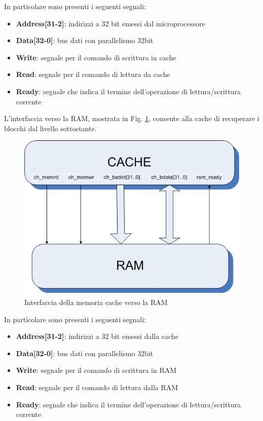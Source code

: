 In particolare sono presenti i seguenti segnali:
\begin{itemize} %
\item \textbf{Address[31-2]}: indirizzi a 32 bit emessi dal microprocessore
\item \textbf{Data[32-0]}: bus dati con parallelismo 32bit 
\item \textbf{Write}: segnale per il comando di scrittura in cache
\item \textbf{Read}: segnale per il comando di lettura da cache
\item \textbf{Ready}: segnale che indica il termine dell'operazione di lettura/scrittura corrente
\end{itemize}

L'interfaccia verso la RAM, mostrata in Fig. \ref{fig:int_ram}, consente alla cache di recuperare i blocchi dal livello sottostante.

\begin{figure}[!h]
\centering
\includegraphics[width=\textwidth]{img/cache-ram.jpg}
\caption{Interfaccia della memoria cache verso la RAM}
\label{fig:int_ram}
\end{figure}

In particolare sono presenti i seguenti segnali:
\begin{itemize} %
\item \textbf{Address[31-2]}: indirizzi a 32 bit emessi dalla cache
\item \textbf{Data[32-0]}: bus dati con parallelismo 32bit 
\item \textbf{Write}: segnale per il comando di scrittura in RAM
\item \textbf{Read}: segnale per il comando di lettura dalla RAM
\item \textbf{Ready}: segnale che indica il termine dell'operazione di lettura/scrittura corrente
\end{itemize}

